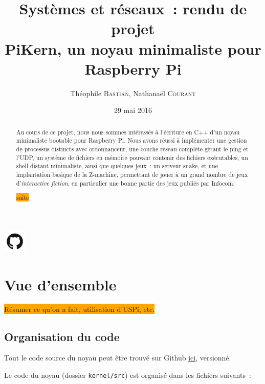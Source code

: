 \documentclass[11pt,a4paper]{article}
\author{Théophile \textsc{Bastian}, Nathanaël \textsc{Courant}}
\title{Systèmes et réseaux~: rendu de projet\\
{\small PiKern, un noyau minimaliste pour Raspberry Pi}}
\date{29 mai 2016}
\newcommand{\fname}[1]{\texttt{#1}} %
\newcommand{\todo}[1]{\colorbox{orange}{\color{blue}{\Large TODO:} #1}}
\begin{document}
\maketitle

\begin{abstract}
Au cours de ce projet, nous nous sommes intéressés à l'écriture en C++ d'un
noyau minimaliste bootable pour Raspberry Pi. Nous avons réussi à implémenter
une gestion de processus distincts avec ordonnanceur, une couche réseau
complète gérant le ping et l'UDP, un système de fichiers en mémoire
pouvant contenir des fichiers exécutables, un shell distant
minimaliste, ainsi que quelques jeux~: un serveur snake, et une
implantation basique de la Z-machine, permettant de jouer à un grand
nombre de jeux d'\textit{interactive fiction}, en particulier une
bonne partie des jeux publiés par Infocom.

	\todo{suite}
\end{abstract}

\begin{center}
	\href{https://github.com/tobast/sysres-pikern}
		{\Large \includegraphics[height=3em]{github.png}
		}
\end{center}

\tableofcontents
\newpage

\section{Vue d'ensemble}

\todo{Résumer ce qu'on a fait, utilisation d'USPi, etc.}

\subsection{Organisation du code}

Tout le code source du noyau peut être trouvé sur Github
\href{https://github.com/tobast/sysres-pikern}{ici}, versionné.

Le code du noyau (dossier \fname{kernel/src}) est organisé dans les fichiers
suivants~:
\end{document}
